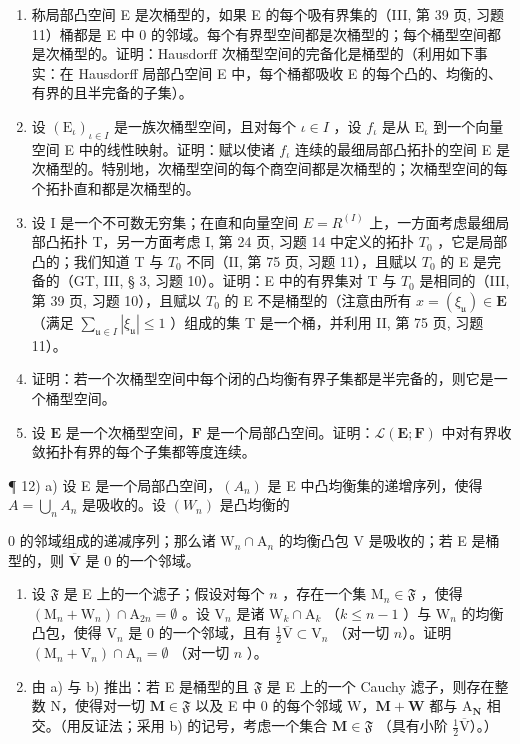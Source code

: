 \begin{enumerate}
\def\labelenumi{\arabic{enumi})}
\setcounter{enumi}{6}
\item
  称局部凸空间 E 是次桶型的，如果 E 的每个吸有界集的（III, 第 39 页, 习题 11）桶都是 E 中 0 的邻域。每个有界型空间都是次桶型的；每个桶型空间都是次桶型的。证明：Hausdorff 次桶型空间的完备化是桶型的（利用如下事实：在 Hausdorff 局部凸空间 E 中，每个桶都吸收 E 的每个凸的、均衡的、有界的且半完备的子集）。
\item
  设 \((\mathrm{E}_{\iota})_{\iota\in I}\) 是一族次桶型空间，且对每个 \(\iota\in I\) ，设 \(f_{\iota}\) 是从 \(\mathrm{E}_{\iota}\) 到一个向量空间 E 中的线性映射。证明：赋以使诸 \(f_{\iota}\) 连续的最细局部凸拓扑的空间 E 是次桶型的。特别地，次桶型空间的每个商空间都是次桶型的；次桶型空间的每个拓扑直和都是次桶型的。
\item
  设 I 是一个不可数无穷集；在直和向量空间 \(E = R^{(I)}\) 上，一方面考虑最细局部凸拓扑 T，另一方面考虑 I, 第 24 页, 习题 14 中定义的拓扑 \(T_{0}\) ，它是局部凸的；我们知道 T 与 \(T_{0}\) 不同（II, 第 75 页, 习题 11），且赋以 \(T_{0}\) 的 E 是完备的（GT, III, § 3, 习题 10）。证明：E 中的有界集对 T 与 \(T_{0}\) 是相同的（III, 第 39 页, 习题 10），且赋以 \(T_{0}\) 的 E 不是桶型的（注意由所有 \(x = (\xi_{\mathfrak{u}}) \in \mathbf{E}\) （满足 \(\sum_{\mathfrak{u} \in I} |\xi_{\mathfrak{u}}| \leqslant 1\) ）组成的集 T 是一个桶，并利用 II, 第 75 页, 习题 11）。
\item
  证明：若一个次桶型空间中每个闭的凸均衡有界子集都是半完备的，则它是一个桶型空间。
\item
  设 \(\mathbf{E}\) 是一个次桶型空间，\(\mathbf{F}\) 是一个局部凸空间。证明：\(\mathcal{L}(\mathbf{E};\mathbf{F})\) 中对有界收敛拓扑有界的每个子集都等度连续。
\end{enumerate}

¶ 12) a) 设 E 是一个局部凸空间，\((A_n)\) 是 E 中凸均衡集的递增序列，使得 \(A = \bigcup_{n} A_n\) 是吸收的。设 \((W_n)\) 是凸均衡的

0 的邻域组成的递减序列；那么诸 \(\mathrm{W}_n\cap \mathrm{A}_n\) 的均衡凸包 V 是吸收的；若 E 是桶型的，则 \(\overline{\mathbf{V}}\) 是 0 的一个邻域。

\begin{enumerate}
\def\labelenumi{\alph{enumi})}
\setcounter{enumi}{1}
\item
  设 \(\mathfrak{F}\) 是 E 上的一个滤子；假设对每个 \(n\) ，存在一个集 \(\mathrm{M}_n \in \mathfrak{F}\) ，使得 \((\mathrm{M}_n + \mathrm{W}_n) \cap \mathrm{A}_{2n} = \emptyset\) 。设 \(\mathrm{V}_n\) 是诸 \(\mathrm{W}_k \cap \mathrm{A}_k\) （\(k \leqslant n - 1\) ）与 \(\mathrm{W}_n\) 的均衡凸包，使得 \(\mathrm{V}_n\) 是 0 的一个邻域，且有 \(\frac{1}{2}\overline{\mathrm{V}} \subset \mathrm{V}_n\) （对一切 \(n\)）。证明 \((\mathrm{M}_n + \mathrm{V}_n) \cap \mathrm{A}_n = \emptyset\) （对一切 \(n\) ）。
\item
  由 a) 与 b) 推出：若 E 是桶型的且 \(\mathfrak{F}\) 是 E 上的一个 Cauchy 滤子，则存在整数 N，使得对一切 \(\mathbf{M} \in \mathfrak{F}\) 以及 E 中 0 的每个邻域 W，\(\mathbf{M} + \mathbf{W}\) 都与 \(\mathrm{A}_{\mathbf{N}}\) 相交。（用反证法；采用 b) 的记号，考虑一个集合 \(\mathbf{M} \in \mathfrak{F}\) （具有小阶 \(\frac{1}{2}\overline{\mathrm{V}}\)）。）
\end{enumerate}

